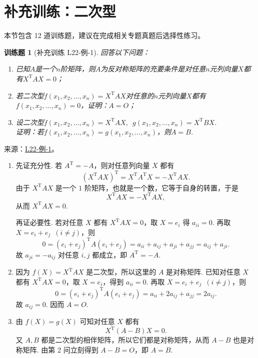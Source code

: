 \documentclass[12pt,fontset=fandol]{ctexart}
\newtheorem{exercise}{训练题}[section]
\begin{document}
\section{补充训练：二次型}

本节包含 12 道训练题，建议在完成相关专题真题后选择性练习。

\begin{exercise}[补充训练 L22-例-1]\label{prob:L22-例-1}
回答以下问题：
    \begin{enumerate}
        \item 已知$A$是一个$n$阶矩阵，则$A$为反对称矩阵的充要条件是对任意$n$元列向量$X$都有$X^\mathrm{T}AX=0$；

        \item 若二次型$f(x_1,x_2,\ldots,x_n)=X^\mathrm{T}AX$对任意的$n$元列向量$X$都有$f(x_1,x_2,\ldots,x_n)=0$，证明：$A=O$；

        \item 设二次型$f(x_1,x_2,\ldots,x_n)=X^\mathrm{T}AX,\enspace g(x_1,x_2,\ldots,x_n)=X^\mathrm{T}BX$.\\
              证明：若$f(x_1,x_2,\ldots,x_n)=g(x_1,x_2,\ldots,x_n)$，则$A=B$.
    \end{enumerate}
\end{exercise}
\noindent 来源：\href{https://github.com/yhwu-is/Linear-Algebra-Left-Undone/blob/new/%E8%AE%B2%E4%B9%89/%E4%B8%93%E9%A2%98/22%20%E4%BA%8C%E6%AC%A1%E5%9E%8B.tex}{L22-例-1}。
\begin{solve}
\begin{enumerate}
        \item 先证充分性. 若 $A^\mathrm{T}=-A$，则对任意列向量 $X$ 都有
              \[
                  (X^\mathrm{T}AX)^\mathrm{T}=X^\mathrm{T}A^\mathrm{T}X=-X^\mathrm{T}AX.
              \]
              由于 $X^\mathrm{T}AX$ 是一个 $1$ 阶矩阵，也就是一个数，它等于自身的转置，于是
              \[
                  X^\mathrm{T}AX=-X^\mathrm{T}AX,
              \]
              从而 $X^\mathrm{T}AX=0$.

              再证必要性. 若对任意 $X$ 都有 $X^\mathrm{T}AX=0$，取 $X=e_i$ 得 $a_{ii}=0$. 再取 $X=e_i+e_j\enspace(i\neq j)$，则
              \[
                  0=(e_i+e_j)^\mathrm{T}A(e_i+e_j)=a_{ii}+a_{ij}+a_{ji}+a_{jj}=a_{ij}+a_{ji}.
              \]
              故 $a_{ji}=-a_{ij}$ 对任意 $i,j$ 都成立，即 $A^\mathrm{T}=-A$.

        \item 因为 $f(X)=X^\mathrm{T}AX$ 是二次型，所以这里的 $A$ 是对称矩阵. 已知对任意 $X$ 都有 $X^\mathrm{T}AX=0$，取 $X=e_i$，得到 $a_{ii}=0$. 再取 $X=e_i+e_j\enspace(i\neq j)$，则
              \[
                  0=(e_i+e_j)^\mathrm{T}A(e_i+e_j)=a_{ii}+2a_{ij}+a_{jj}=2a_{ij}.
              \]
              故 $a_{ij}=0$. 因而 $A=O$.

        \item 由 $f(X)=g(X)$ 可知对任意 $X$ 都有
              \[
                  X^\mathrm{T}(A-B)X=0.
              \]
              又 $A,B$ 都是二次型的相伴矩阵，所以它们都是对称矩阵，从而 $A-B$ 也是对称矩阵. 由第 2 问立刻得到 $A-B=O$，即 $A=B$.
    \end{enumerate}
\end{solve}
\end{document}
